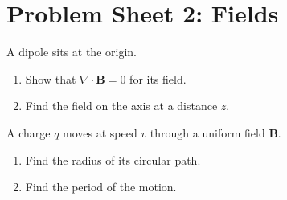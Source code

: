\documentclass[12pt]{article}
\begin{document}
\section*{Problem Sheet 2: Fields}

A dipole sits at the origin.

\begin{enumerate}
\item Show that $\nabla \cdot \mathbf{B} = 0$ for its field.
\item Find the field on the axis at a distance $z$.
\end{enumerate}

A charge $q$ moves at speed $v$ through a uniform field $\mathbf{B}$.

\begin{enumerate}
\item Find the radius of its circular path.
\item Find the period of the motion.
\end{enumerate}
\end{document}
